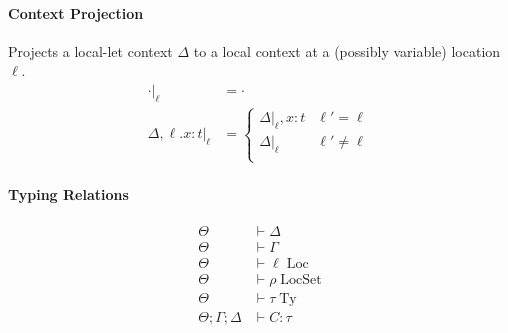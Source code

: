\documentclass{article}
\theoremstyle{definition}
\newcommand\proj[2]{\ensuremath{\left.#1\right|_{#2}}}
\begin{document}
\paragraph{Context Projection}
Projects a local-let context $\Delta$ to a local context at a (possibly variable) location $\ell$.
\begin{align*}
	\proj{\cdot}{\ell} &= \cdot \\
	\proj{\Delta, \ell.x : t}{\ell} &=
		\begin{cases} 
      		\proj{\Delta}{\ell}, x : t & \ell' = \ell \\
      		\proj{\Delta}{\ell} & \ell' \neq \ell \\
   		\end{cases}
\end{align*}

\paragraph{Typing Relations}
\begin{align*}
	\Theta &\vdash \Delta \tag{Local-Let Context Well-Formedness}\\
	\Theta &\vdash \Gamma \tag{Choreography Context Well-Formedness}\\
	\Theta &\vdash \ell \;\text{Loc} \tag{Location Well-Formedness}\\
	\Theta &\vdash \rho \;\text{LocSet} \tag{Location-Set Well-Formedness}\\
	\Theta &\vdash \tau \;\text{Ty} \tag{Choreography Type Well-Formedness}\\
	\Theta;\Gamma;\Delta &\vdash C : \tau \tag{Choreography Typing Relation}
\end{align*}
\end{document}
